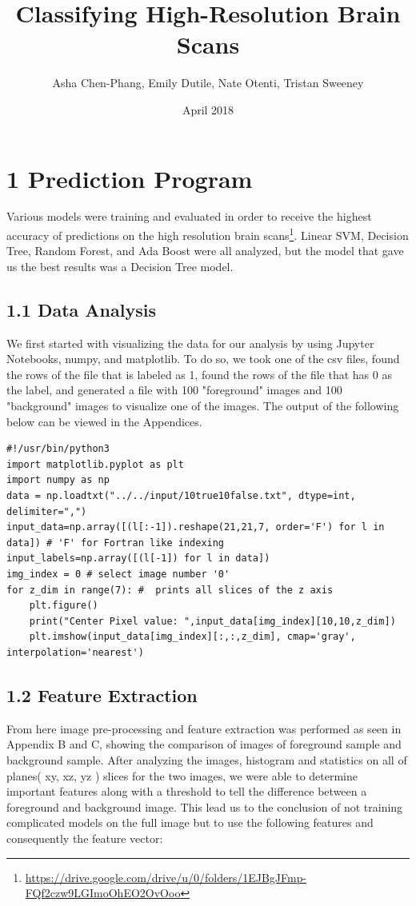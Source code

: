 \documentclass{neu_handout}
\title{Classifying High-Resolution Brain Scans}
\author{Asha Chen-Phang, Emily Dutile, Nate Otenti, Tristan Sweeney}
\date{April 2018}
\begin{document}
\section*{1 Prediction Program}

Various models were training and evaluated in order to receive the highest accuracy of predictions on the high resolution brain scans\footnote{\url{https://drive.google.com/drive/u/0/folders/1EJBgJFmp-FQf2czw9LGImoOhEO2OvOoo}}. Linear SVM, Decision Tree, Random Forest, and Ada Boost were all analyzed, but the model that gave us the best results was a Decision Tree model.


\subsection*{1.1 Data Analysis}

We first started with visualizing the data for our analysis by using Jupyter Notebooks, numpy, and matplotlib. To do so, we took one of the csv files, found the rows of the file that is labeled as 1, found the rows of the file that has 0 as the label, and generated a file with 100 "foreground" images and 100 "background" images to visualize one of the images. The output of the following below can be viewed in the Appendices.

\begin{lstlisting}
#!/usr/bin/python3
import matplotlib.pyplot as plt
import numpy as np
data = np.loadtxt("../../input/10true10false.txt", dtype=int, delimiter=",")
input_data=np.array([(l[:-1]).reshape(21,21,7, order='F') for l in data]) # 'F' for Fortran like indexing
input_labels=np.array([(l[-1]) for l in data])
img_index = 0 # select image number '0'
for z_dim in range(7): #  prints all slices of the z axis
    plt.figure()
    print("Center Pixel value: ",input_data[img_index][10,10,z_dim])
    plt.imshow(input_data[img_index][:,:,z_dim], cmap='gray', interpolation='nearest')
\end{lstlisting}

\subsection*{1.2 Feature Extraction}
From here image pre-processing and feature extraction was performed as seen in Appendix B and C, showing the comparison of images of foreground sample and background sample. After analyzing the images, histogram and statistics on all of planes( xy, xz, yz ) slices for the two images, we were able to determine important features along with a threshold to tell the difference between a foreground and background image. This lead us to the conclusion of not training complicated models on the full image but to use the following features and consequently the feature vector:
\end{document}
